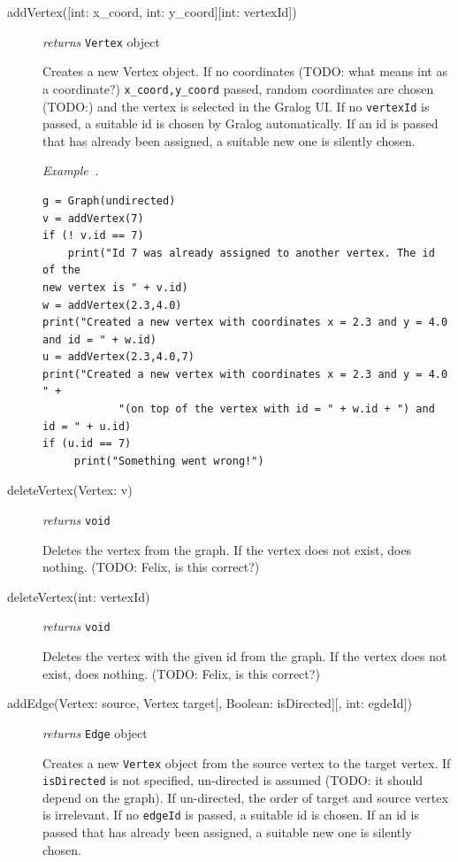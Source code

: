 \documentclass{article}
\newcounter{example}
\newenvironment{example}[1][]{\refstepcounter{example}\par\medskip
   \noindent \textit{Example~\theexample. #1} \rmfamily}{\medskip}
\begin{document}
\begin{description}
\item[addVertex({[int: x\_coord, int: y\_coord]}{[int: vertexId]})]\emph{returns}
  \texttt{Vertex} object

  Creates a new Vertex object. If no coordinates (TODO: what means int
  as a coordinate?) \texttt{x\_coord,y\_coord} passed,
  random coordinates are chosen (TODO:) and the vertex is selected in
  the Gralog UI. If no \texttt{vertexId} is passed, a suitable id is
  chosen by Gralog automatically. If an id is passed that has already
  been assigned, a suitable new one is silently chosen.

  \begin{example}
\begin{verbatim}
g = Graph(undirected)
v = addVertex(7)
if (! v.id == 7)
    print("Id 7 was already assigned to another vertex. The id of the
new vertex is " + v.id)
w = addVertex(2.3,4.0)
print("Created a new vertex with coordinates x = 2.3 and y = 4.0 and id = " + w.id)
u = addVertex(2.3,4.0,7)
print("Created a new vertex with coordinates x = 2.3 and y = 4.0 " +
            "(on top of the vertex with id = " + w.id + ") and id = " + u.id)
if (u.id == 7)
     print("Something went wrong!")
\end{verbatim}
  \end{example}


  
\item[deleteVertex(Vertex: v)] \emph{returns} \texttt{void}

Deletes the vertex from the graph. If the vertex does not exist, does
nothing. (TODO: Felix, is this correct?)

\item[deleteVertex(int: vertexId)] \emph{returns} \texttt{void}

Deletes the vertex with the given id from the graph. If the vertex does not exist, does
nothing. (TODO: Felix, is this correct?)

\item[addEdge(Vertex: source, Vertex target{[, Boolean: isDirected][,
    int: egdeId]})] \emph{returns} \texttt{Edge} object


Creates a new \texttt{Vertex} object from the source vertex to the
target vertex. If \texttt{isDirected} is not specified, un-directed is
assumed (TODO: it should depend on the graph). If un-directed, the
order of target and source vertex is irrelevant. If no \texttt{edgeId}
is passed, a suitable id is chosen. If an id is passed that has
already been assigned, a suitable new one is silently chosen.


\end{description}
\end{document}
